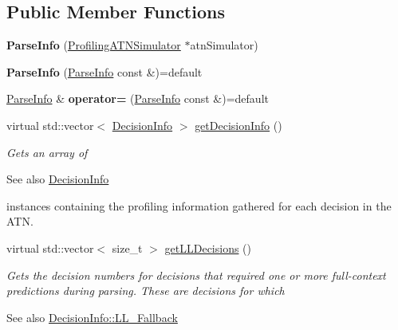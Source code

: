 \subsection*{Public Member Functions}
\begin{DoxyCompactItemize}
\item 
\mbox{\label{classantlr4_1_1atn_1_1ParseInfo_ae69458ea414cbc036298169a5858c5a1}} 
{\bfseries Parse\+Info} (\hyperlink{classantlr4_1_1atn_1_1ProfilingATNSimulator}{Profiling\+A\+T\+N\+Simulator} $\ast$atn\+Simulator)
\item 
\mbox{\label{classantlr4_1_1atn_1_1ParseInfo_a0c31ca00048cc8f5d46515cab5a7f277}} 
{\bfseries Parse\+Info} (\hyperlink{classantlr4_1_1atn_1_1ParseInfo}{Parse\+Info} const \&)=default
\item 
\mbox{\label{classantlr4_1_1atn_1_1ParseInfo_adb7e9888f27f508927314b4867b31f9b}} 
\hyperlink{classantlr4_1_1atn_1_1ParseInfo}{Parse\+Info} \& {\bfseries operator=} (\hyperlink{classantlr4_1_1atn_1_1ParseInfo}{Parse\+Info} const \&)=default
\item 
virtual std\+::vector$<$ \hyperlink{classantlr4_1_1atn_1_1DecisionInfo}{Decision\+Info} $>$ \hyperlink{classantlr4_1_1atn_1_1ParseInfo_a637a7b2c52ca5cd2a3f247ba5de623f7}{get\+Decision\+Info} ()
\begin{DoxyCompactList}\small\item\em Gets an array of \begin{DoxySeeAlso}{See also}
\hyperlink{classantlr4_1_1atn_1_1DecisionInfo}{Decision\+Info}


\end{DoxySeeAlso}
instances containing the profiling information gathered for each decision in the A\+TN. \end{DoxyCompactList}\item 
virtual std\+::vector$<$ size\+\_\+t $>$ \hyperlink{classantlr4_1_1atn_1_1ParseInfo_a6f9fb6e5fc44568c6e6f0337ff9cb357}{get\+L\+L\+Decisions} ()
\begin{DoxyCompactList}\small\item\em Gets the decision numbers for decisions that required one or more full-\/context predictions during parsing. These are decisions for which \begin{DoxySeeAlso}{See also}
\hyperlink{classantlr4_1_1atn_1_1DecisionInfo_a311fb2f2a4f7c6108106b8700f03cb18}{Decision\+Info\+::\+L\+L\+\_\+\+Fallback}



\end{DoxySeeAlso}
\end{DoxyCompactList}
\end{DoxyCompactItemize}
